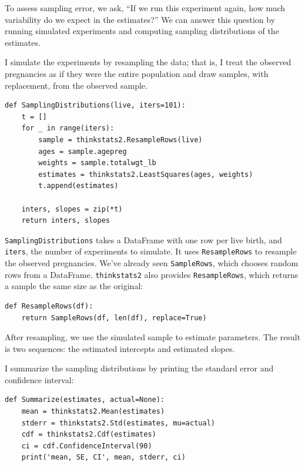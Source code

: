 \documentclass[12pt]{book}
\theoremstyle{exercise}
\begin{document}
To assess sampling error, we ask, ``If we run this experiment again,
how much variability do we expect in the estimates?''  We can
answer this question by running simulated experiments and computing
sampling distributions of the estimates.%
%

I simulate the experiments by resampling the data; that is, I treat
the observed pregnancies as if they were the entire population
and draw samples, with replacement, from the observed sample.%
%

\begin{verbatim}
def SamplingDistributions(live, iters=101):
    t = []
    for _ in range(iters):
        sample = thinkstats2.ResampleRows(live)
        ages = sample.agepreg
        weights = sample.totalwgt_lb
        estimates = thinkstats2.LeastSquares(ages, weights)
        t.append(estimates)

    inters, slopes = zip(*t)
    return inters, slopes
\end{verbatim}

{\tt SamplingDistributions} takes a DataFrame with one row per live
birth, and {\tt iters}, the number of experiments to simulate.  It
uses {\tt ResampleRows} to resample the observed pregnancies.  We've
already seen {\tt SampleRows}, which chooses random rows from a
DataFrame.  {\tt thinkstats2} also provides {\tt ResampleRows}, which
returns a sample the same size as the original:%
%

\begin{verbatim}
def ResampleRows(df):
    return SampleRows(df, len(df), replace=True)
\end{verbatim}

After resampling, we use the simulated sample to estimate parameters.
The result is two sequences: the estimated intercepts and estimated
slopes.%

I summarize the sampling distributions by printing the standard
error and confidence interval:%

\begin{verbatim}
def Summarize(estimates, actual=None):
    mean = thinkstats2.Mean(estimates)
    stderr = thinkstats2.Std(estimates, mu=actual)
    cdf = thinkstats2.Cdf(estimates)
    ci = cdf.ConfidenceInterval(90)
    print('mean, SE, CI', mean, stderr, ci)
\end{verbatim}
\end{document}
